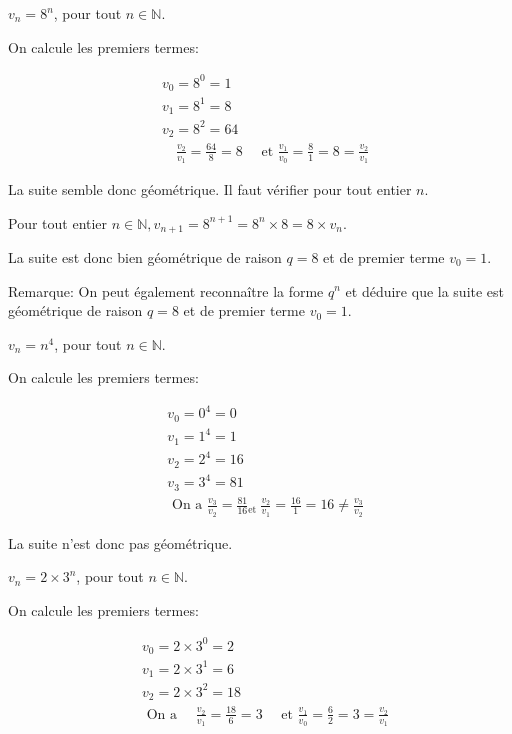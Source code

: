 \documentclass[11pt,a4paper]{article}  %
\begin{document}
\begin{enumMet}
	\item $v_n=8^n$, pour tout $n \in \mathbb{N}$.
	\begin{corrBox}
		On calcule les premiers termes:
		
		$$
		\begin{aligned}
			& v_0=8^0=1 \\
			& v_1=8^1=8 \\
			& v_2=8^2=64 \\
			& \quad \frac{v_2}{v_1}=\frac{64}{8}=8 \quad \text { et } \frac{v_1}{v_0}=\frac{8}{1}=8=\frac{v_2}{v_1}
		\end{aligned}
		$$
		
		
		La suite semble donc géométrique. Il faut vérifier pour tout entier $n$.
		
		Pour tout entier $n \in \mathbb{N}, v_{n+1}=8^{n+1}=8^n \times 8=8 \times v_n$.
		
		La suite est donc bien géométrique de raison $q=8$ et de premier terme $v_0=1$.
		
		Remarque: On peut également reconnaître la forme $q^n$ et déduire que la suite est géométrique de raison $q=8$ et de premier terme $v_0=1$.		
	\end{corrBox}
	\item $v_n=n^4$, pour tout $n \in \mathbb{N}$.
	\begin{corrBox}
		On calcule les premiers termes:
		
		$$
		\begin{aligned}
			& v_0=0^4=0 \\
			& v_1=1^4=1 \\
			& v_2=2^4=16 \\
			& v_3=3^4=81 \\
			& \text { On a } \frac{v_3}{v_2}=\frac{81}{16}{ }_{\text {et }} \frac{v_2}{v_1}=\frac{16}{1}=16\neq\frac{v_3}{v_2}
		\end{aligned}
		$$
		
		
		La suite n'est donc pas géométrique.		
	\end{corrBox}
	\item $v_n=2 \times 3^n$, pour tout $n \in \mathbb{N}$.
	\begin{corrBox}
		On calcule les premiers termes:
		
		$$
		\begin{aligned}
			& v_0=2 \times 3^0=2 \\
			& v_1=2 \times 3^1=6 \\
			& v_2=2 \times 3^2=18 \\
			&  \text { On a } \quad \frac{v_2}{v_1}=\frac{18}{6}=3 \quad \text { et } \frac{v_1}{v_0}=\frac{6}{2}=3=\frac{v_2}{v_1}
		\end{aligned}
		$$
		

\end{corrBox}
\end{enumMet}
\end{document}
